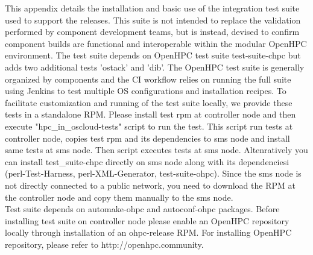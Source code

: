 This appendix details the installation and basic use of the integration test suite used to support the releases. This suite is not intended to replace the validation performed by component development teams, but is instead, devised to confirm component builds are functional and interoperable within the modular OpenHPC environment. The test suite depends on OpenHPC test suite test-suite-chpc but adds two additional tests 'ostack' and 'dib'. The OpenHPC test suite is generally organized by components and the CI workflow relies on running the full suite using Jenkins to test multiple OS configurations and installation recipes. To facilitate customization and running of the test suite locally, we provide these tests in a standalone RPM. Please install test rpm at controller node and then execute "hpc\_in\_oscloud-tests" script to run the test. This script run tests at controller node, copies test rpm  and its dependencies to sms node and install same tests at sms node. Then script executes tests at sms node. Altenratively you can install test\_suite-chpc directly on sms node along with its dependenciesi (perl-Test-Harness, perl-XML-Generator, test-suite-ohpc). Since the sms node is not directly connected to a public network, you need to download the RPM at the controller node and copy them manually to the sms node. \\
Test suite depends on automake-ohpc and autoconf-ohpc packages. Before installing test suite on controller node please enable an OpenHPC repository locally through installation of an ohpc-release RPM. For installing OpenHPC repository, please refer to http://openhpc.community.

